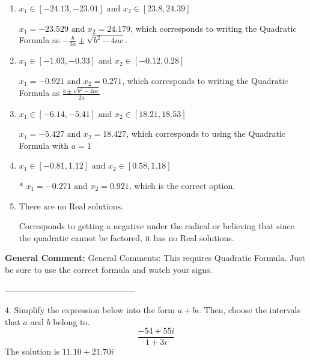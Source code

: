 \documentclass{extbook}[14pt]
\begin{document}
\begin{enumerate}[label=\Alph*.] 
\item $ x_1 \in [-24.13, -23.01] \text{ and } x_2 \in [23.8, 24.39] $ 

  $x_1 = -23.529 \text{ and } x_2 = 24.179$, which corresponds to writing the Quadratic Formula as $-\frac{b}{2a} \pm \sqrt{b^2 - 4ac}$. 
\item $ x_1 \in [-1.03, -0.33] \text{ and } x_2 \in [-0.12, 0.28] $ 

  $x_1 = -0.921 \text{ and } x_2 = 0.271$, which corresponds to writing the Quadratic Formula as $\frac{b \pm \sqrt{b^2 - 4ac}}{2a}$ 
\item $ x_1 \in [-6.14, -5.41] \text{ and } x_2 \in [18.21, 18.53] $ 

  $x_1 = -5.427 \text{ and } x_2 = 18.427$, which corresponds to using the Quadratic Formula with $a=1$ 
\item $ x_1 \in [-0.81, 1.12] \text{ and } x_2 \in [0.58, 1.18] $ 

 * $x_1 = -0.271 \text{ and } x_2 = 0.921$, which is the correct option. 
\item $ \text{There are no Real solutions.} $ 

 Corresponds to getting a negative under the radical or believing that since the quadratic cannot be factored, it has no Real solutions. 
\end{enumerate} 
 
\textbf{General Comment:} General Comments: This requires Quadratic Formula. Just be sure to use the correct formula and watch your signs. 

-----------------------------------------------

4. Simplify the expression below into the form $a+bi$. Then, choose the intervals that $a$ and $b$ belong to.
\[ \frac{-54 + 55 i}{1 + 3 i} \] 
The solution is $ 11.10  + 21.70 i $ 
\end{document}
